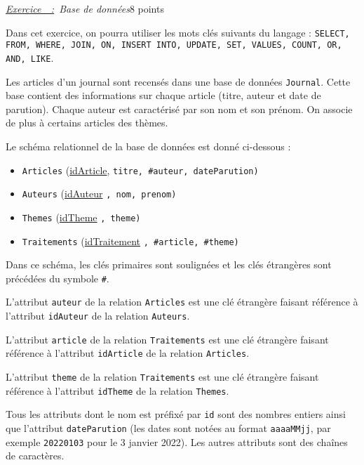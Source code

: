 \documentclass[a4paper, 11pt]{article}
\newcounter{exercice}
\newenvironment{Exercice}[1][]{
    \refstepcounter{exercice}
    \par
    \noindent
    {\large
    \underline{\textit{Exercice~\theexercice~:}}~#1}
    \par}
    {\vspace{1em}}
\begin{document}
\begin{Exercice}[\textit{Base de données}\hfill 8 points]

  Dans cet exercice, on pourra utiliser les mots clés suivants du langage  : \texttt{SELECT, FROM, WHERE, JOIN, ON, INSERT INTO, UPDATE,
 SET, VALUES, COUNT, OR, AND, LIKE}.

  Les articles d'un journal sont recensés dans une base de données \texttt{Journal}. Cette base contient des informations sur chaque article (titre,
  auteur et date de parution). Chaque auteur est caractérisé par son nom et son prénom. On associe de plus à certains articles des thèmes.

  Le schéma relationnel de la base de données est donné ci-dessous :
  \begin{itemize}
    \item \texttt{Articles} (\underline{idArticle}, \texttt{titre, #auteur, dateParution)}
    \item \texttt{Auteurs} (\underline{idAuteur} \texttt{, nom, prenom)}
    \item \texttt{Themes} (\underline{idTheme} \texttt{, theme)}
    \item \texttt{Traitements} (\underline{idTraitement} \texttt{, #article, #theme)}
  \end{itemize}

  Dans ce schéma, les clés primaires sont soulignées et les clés étrangères sont précédées du symbole \texttt{#}.

  L'attribut \texttt{auteur} de la relation \texttt{Articles} est une clé étrangère faisant référence
  à l'attribut \texttt{idAuteur} de la relation \texttt{Auteurs}.

  L'attribut \texttt{article} de la relation \texttt{Traitements} est une clé étrangère faisant référence
  à l'attribut \texttt{idArticle} de la relation \texttt{Articles}.

  L'attribut \texttt{theme} de la relation \texttt{Traitements} est une clé étrangère faisant référence
  à l'attribut \texttt{idTheme} de la relation \texttt{Themes}.

  Tous les attributs dont le nom est préfixé par \texttt{id} sont des nombres entiers ainsi que l'attribut \texttt{dateParution} (les dates
  sont notées au format \texttt{aaaaMMjj}, par exemple \texttt{20220103} pour le 3 janvier 2022). Les autres attributs sont des chaînes de caractères.


\end{Exercice}
\end{document}
